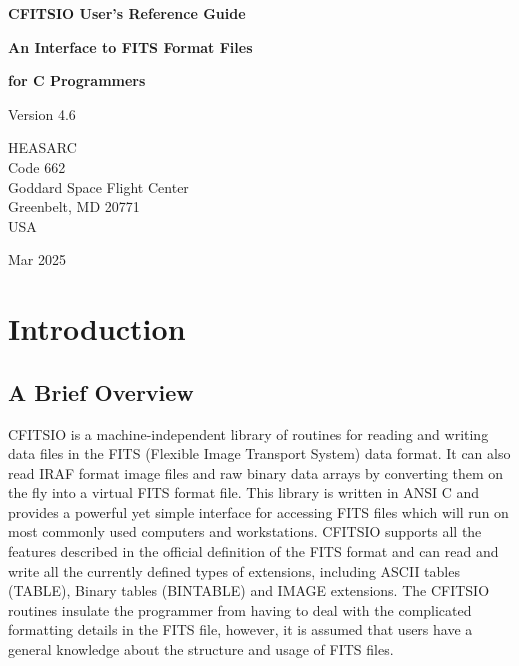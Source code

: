 \documentclass[11pt]{book}
\begin{document}

\begin{titlepage}
\normalsize
\vspace*{4.0cm}
\begin{center}
{\Huge \bf CFITSIO User's Reference Guide}\\
\end{center}
\medskip 
\medskip 
\begin{center}
{\LARGE \bf An Interface to FITS Format Files}\\
\end{center}
\begin{center}
{\LARGE \bf for C Programmers}\\
\end{center}
\medskip
\medskip
\begin{center}
{\Large Version 4.6 \\}
\end{center}
\bigskip
\vskip 2.5cm
\begin{center}
{HEASARC\\
Code 662\\
Goddard Space Flight Center\\
Greenbelt, MD 20771\\
USA}
\end{center}

\vfill
\bigskip
\begin{center}
{\Large Mar 2025\\}
\end{center}
\vfill
\end{titlepage}

\clearpage

\tableofcontents
\chapter{Introduction }


\section{ A Brief Overview}

CFITSIO is a machine-independent library of routines for reading and
writing data files in the FITS (Flexible Image Transport System) data
format.  It can also read IRAF format image files and raw binary data
arrays by converting them on the fly into a virtual FITS format file.
This library is written in ANSI C and provides a powerful yet simple
interface for accessing FITS files which will run on most commonly used
computers and workstations.  CFITSIO supports all the features
described in the official definition of the FITS format and can
read and write all the currently defined types of extensions, including
ASCII tables (TABLE), Binary tables (BINTABLE) and IMAGE extensions.
The CFITSIO routines insulate the programmer from having to deal with
the complicated formatting details in the FITS file, however, it is
assumed that users have a general knowledge about the structure and
usage of FITS files.
\end{document}
